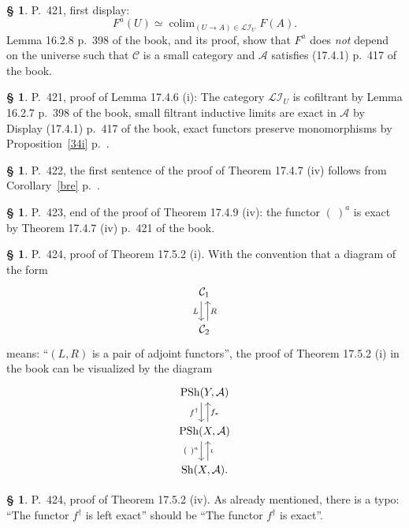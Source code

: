 \documentclass[12pt]{article}%
\theoremstyle{remark}
\theoremstyle{definition}
\newtheorem{s}[thm]{\S}%
\newcommand{\cc}{\mathcal}
\newcommand{\oo}{\operatorname}
\newcommand{\A}{\mathcal A}
\newcommand{\C}{\mathcal C}
\DeclareMathOperator*{\colim}{colim}%
\begin{document}
%

\begin{s}\label{fau}
P.~421, first display: 
$$
F^a(U)\simeq\colim_{(U\to A)\in\cc{LI}_U}F(A).
$$ 
Lemma 16.2.8 p.~398 of the book, and its proof, show that $F^a$ does {\em not} depend on the universe such that $\C$ is a small category and $\A$ satisfies (17.4.1) p.~417 of the book.
\end{s}

%

\begin{s}P.~421, proof of Lemma 17.4.6 (i): The category $\cc{LI}_U$ is cofiltrant by Lemma 16.2.7 p.~398 of the book, small filtrant inductive limits are exact in $\A$ by Display (17.4.1) p.~417 of the book, exact functors preserve monomorphisms by Proposition~\ref{34i} p.~\pageref{34i}.
\end{s}

%

\begin{s} 
P.~422, the first sentence of the proof of Theorem 17.4.7 (iv) follows from Corollary~\ref{bre} p.~\pageref{bre}. 
\end{s}

%

\begin{s} 
P.~423, end of the proof of Theorem 17.4.9 (iv): the functor $(\ )^a$ is exact by Theorem 17.4.7 (iv) p.~421 of the book.
\end{s}

%

\begin{s} 
P.~424, proof of Theorem 17.5.2 (i). With the convention that a diagram of the form 
$$
\begin{tikzcd} 
\C_1\ar[xshift=-0.7ex]{d}[swap]{L}\\ \C_2\ar[xshift=0.7ex]{u}[swap]{R}
\end{tikzcd}
$$ 
means: ``$(L,R)$ is a pair of adjoint functors'', the proof of Theorem 17.5.2 (i) in the book can be visualized by the diagram 
$$
\begin{tikzcd} 
\oo{PSh}(Y,\A)\ar[xshift=-0.7ex]{d}[swap]{f^\dagger}\\ 
\oo{PSh}(X,\A)\ar[xshift=0.7ex]{u}[swap]{f_*}\ar[xshift=-0.7ex]{d}[swap]{(\ )^a}\\ 
\oo{Sh}(X,\A).\ar[xshift=0.7ex]{u}[swap]{\iota}
\end{tikzcd}
$$ 
\end{s}

%

\begin{s} 
P.~424, proof of Theorem 17.5.2 (iv). As already mentioned, there is a typo: ``The functor $f^\dagger$ is left exact'' should be ``The functor $f^\dagger$ is exact''. 
\end{s}
\end{document}
